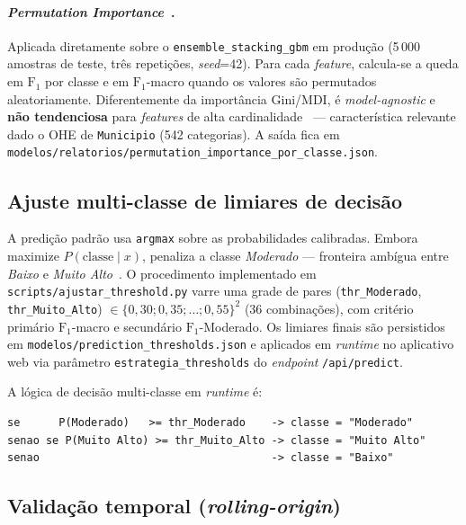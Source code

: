\paragraph{\emph{Permutation Importance}~\cite{breiman2001random,fisher2019all}.} Aplicada diretamente sobre o \texttt{ensemble\_stacking\_gbm} em produção (5\,000 amostras de teste, três repetições, \emph{seed}=42). Para cada \emph{feature}, calcula-se a queda em \(\text{F}_1\) por classe e em \(\text{F}_1\)-macro quando os valores são permutados aleatoriamente. Diferentemente da importância Gini/MDI, é \emph{model-agnostic} e \textbf{não tendenciosa} para \emph{features} de alta cardinalidade~\cite{strobl2007bias} --- característica relevante dado o OHE de \texttt{Municipio} (542 categorias). A saída fica em \texttt{modelos/relatorios/permutation\_importance\_por\_classe.json}.

\subsection{Ajuste multi-classe de limiares de decisão}
\label{subsec:metod_thresholds}

A predição padrão usa \texttt{argmax} sobre as probabilidades calibradas. Embora maximize \(P(\text{classe} \mid x)\), penaliza a classe \emph{Moderado} --- fronteira ambígua entre \emph{Baixo} e \emph{Muito Alto}~\cite{he2009learning}. O procedimento implementado em \texttt{scripts/ajustar\_threshold.py} varre uma grade de pares (\texttt{thr\_Moderado}, \texttt{thr\_Muito\_Alto}) \(\in \{0{,}30; 0{,}35; \ldots; 0{,}55\}^2\) (36 combinações), com critério primário \(\text{F}_1\)-macro e secundário \(\text{F}_1\)-Moderado. Os limiares finais são persistidos em \texttt{modelos/prediction\_thresholds.json} e aplicados em \emph{runtime} no aplicativo web via parâmetro \texttt{estrategia\_thresholds} do \emph{endpoint} \texttt{/api/predict}.

A lógica de decisão multi-classe em \emph{runtime} é:

\begin{verbatim}
se      P(Moderado)   >= thr_Moderado    -> classe = "Moderado"
senao se P(Muito Alto) >= thr_Muito_Alto -> classe = "Muito Alto"
senao                                    -> classe = "Baixo"
\end{verbatim}

\subsection{Validação temporal (\emph{rolling-origin})}
\label{subsec:metod_validacao_temporal}

